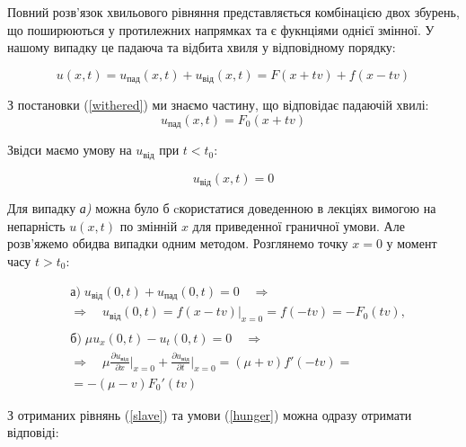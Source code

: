 Повний розв'язок хвильового рівняння представляється комбінацією двох збурень, що поширюються у протилежних напрямках та є фукнціями однієї змінної. У нашому випадку це падаюча та відбита хвиля у відповідному порядку:

\begin{equation}
    u(x,t) = u_{\text{пад}}(x,t) + u_{\text{від}}(x,t) = F(x + tv) + f(x - tv)
\end{equation}

З постановки (\ref{withered}) ми знаємо частину, що відповідає падаючій хвилі:
\begin{equation*}
    u_{\text{пад}}(x,t) = F_0(x + tv)
\end{equation*}

Звідси маємо умову на $u_{\text{від}}$ при $t<t_0$:

\begin{equation} \label{hunger}
    u_{\text{від}}(x,t)=0
\end{equation}

Для випадку \textit{а)} можна було б cкористатися доведенною в лекціях вимогою на непарність $u(x,t)$ по змінній $x$ для приведенної граничної умови. Але розв'яжемо обидва випадки одним методом. Розглянемо точку $x=0$ у момент часу $t>t_0$:

\begin{equation}  \label{slave}
    \begin{aligned} 
            &\text{а)}\;u_{\text{від}}(0,t) + u_{\text{пад}}(0,t) = 0 \quad\Rightarrow\\
            &\Rightarrow\quad u_{\text{від}}(0,t) = f(x - tv)|_{x=0} = f(-tv) = -F_0(tv), \\
            & \\
            &\text{б)}\; \mu u_x(0,t) - u_t(0,t) = 0 \quad\Rightarrow\\
            &\Rightarrow\quad \mu \frac{\partial u_{\text{від}}}{\partial x}\bigg|_{x=0} +\frac{\partial u_{\text{від}}}{\partial t}\bigg|_{x=0} = (\mu + v)f'(-tv) =\\
            &= -(\mu - v)F_0'(tv)
    \end{aligned} 
\end{equation}

З отриманих рівнянь (\ref{slave}) та умови (\ref{hunger}) можна одразу отримати відповіді:

